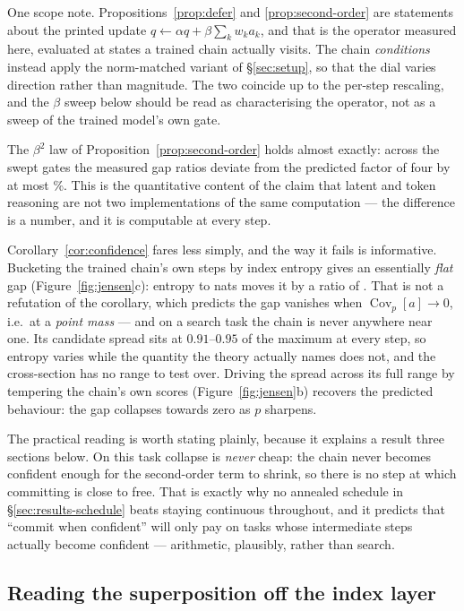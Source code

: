 \documentclass[11pt]{article}
\theoremstyle{definition}
\newcommand{\Cov}{\operatorname{Cov}}
\begin{document}
One scope note. Propositions~\ref{prop:defer} and \ref{prop:second-order} are
statements about the printed update $q \leftarrow \alpha q + \beta\sum_k w_k a_k$, and
that is the operator measured here, evaluated at states a trained chain actually
visits. The chain \emph{conditions} instead apply the norm-matched variant of
\S\ref{sec:setup}, so that the dial varies direction rather than magnitude. The two
coincide up to the per-step rescaling, and the $\beta$ sweep below should be read as
characterising the operator, not as a sweep of the trained model's own gate.

The $\beta^{2}$ law of Proposition~\ref{prop:second-order} holds almost exactly:
across the swept gates the measured gap ratios deviate from the predicted factor of
four by at most \JensenQuadraticError\%. This is the quantitative content of the
claim that latent and token reasoning are not two implementations of the same
computation --- the difference is a number, and it is computable at every step.

Corollary~\ref{cor:confidence} fares less simply, and the way it fails is
informative. Bucketing the trained chain's own steps by index entropy gives an
essentially \emph{flat} gap (Figure~\ref{fig:jensen}c): entropy \JensenLowEntropy to
\JensenHighEntropy nats moves it by a ratio of \JensenGapRatio. That is not a
refutation of the corollary, which predicts the gap vanishes when
$\Cov_p[a] \to 0$, i.e.\ at a \emph{point mass} --- and on a search task the chain is
never anywhere near one. Its candidate spread sits at $0.91$--$0.95$ of the maximum
at every step, so entropy varies while the quantity the theory actually names does
not, and the cross-section has no range to test over. Driving the spread across its
full range by tempering the chain's own scores (Figure~\ref{fig:jensen}b) recovers
the predicted behaviour: the gap collapses towards zero as $p$ sharpens.

The practical reading is worth stating plainly, because it explains a result three
sections below. On this task collapse is \emph{never} cheap: the chain never becomes
confident enough for the second-order term to shrink, so there is no step at which
committing is close to free. That is exactly why no annealed schedule in
\S\ref{sec:results-schedule} beats staying continuous throughout, and it predicts
that ``commit when confident'' will only pay on tasks whose intermediate steps
actually become confident --- arithmetic, plausibly, rather than search.

\subsection{Reading the superposition off the index layer}
\label{sec:results-frontier}
\end{document}
